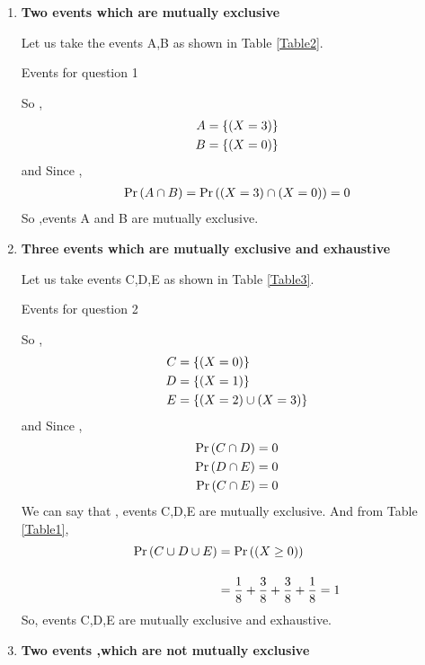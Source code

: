 \documentclass[journal,12pt,twocolumn]{IEEEtran}
\begin{document}
\begin{enumerate}[label=(\roman*)]
    \item 
    \textbf{Two events which are mutually exclusive} 
    
    Let us take the events A,B as shown in Table \ref{Table2}.
    \begin{table}[ht!]
        
        \caption{Events for question 1}
        \label{Table2}
    \end{table}
    So ,
    \begin{align}
        A &= \left\{ (X=3) \right\}\\
        B &= \left\{ (X=0) \right\}
    \end{align}
    and Since ,
    \begin{align}
        \Pr\left(A \cap B\right) = \Pr\left((X=3) \cap (X=0)\right) = 0
    \end{align}
    So ,events A and B are mutually exclusive.
  
    \item \textbf{Three events which are mutually exclusive and exhaustive}
    
    Let us take events C,D,E as shown in Table \ref{Table3}.
    \begin{table}[ht!]
        
        \caption{Events for question 2}
        \label{Table3}
    \end{table}
    So ,
    \begin{align}
        C &= \left\{(X=0)\right\} \\
        D &= \left\{(X=1)\right\} \\
	    E &=  \left\{(X=2) \cup (X=3)\right\}
    \end{align}
    and Since , 
    \begin{align}
        \Pr\left(C \cap D\right) &= 0 \\
        \Pr\left(D \cap E\right) &= 0 \\
        \Pr\left(C \cap E\right) &= 0
    \end{align}
    We can say that , events C,D,E are mutually exclusive. And from Table \ref{Table1},
    \begin{align}
        \Pr\left(C \cup D \cup E\right) &= \Pr\left((X \ge 0)\right) \\[10pt]
                             &= \dfrac{1}{8}+\dfrac{3}{8}+\dfrac{3}{8}+\dfrac{1}{8} = 1
    \end{align}  
    So, events C,D,E are mutually exclusive and exhaustive.
    
    \item \textbf{Two events ,which are not mutually exclusive}
    

\end{enumerate}
\end{document}
